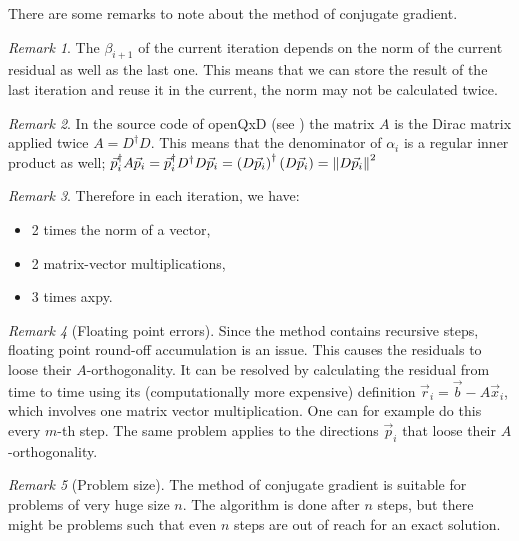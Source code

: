 \documentclass{article}
\theoremstyle{plain} %
\theoremstyle{convention} %
\theoremstyle{remark} %
\newtheorem*{remark}{Remark} %
\numberwithin{equation}{section}
\begin{document}
There are some remarks to note about the method of conjugate gradient.

\begin{remark}
    The $\beta_{i+1}$ of the current iteration depends on the norm of the current residual as well as the last one. This means that we can store the result of the last iteration and reuse it in the current, the norm may not be calculated twice.
\end{remark}

\begin{remark}
    In the source code of openQxD (see \cite{openqxd}) the matrix $A$ is the Dirac matrix applied twice $A = D^{\dagger} D$. This means that the denominator of $\alpha_i$ is a regular inner product as well; $\vec{p}_i^{\dagger} A \vec{p}_i = \vec{p}_i^{\dagger} D^{\dagger} D \vec{p}_i = \left( D \vec{p}_i \right)^{\dagger} \left( D \vec{p}_i \right) = \norm{ D \vec{p}_i }^2$
\end{remark}

\begin{remark}
    Therefore in each iteration, we have:
    \begin{itemize}
        \item 2 times the norm of a vector,
        \item 2 matrix-vector multiplications,
        \item 3 times axpy.\footnotemark
    \end{itemize}
\end{remark}

\begin{remark}[Floating point errors]
    Since the method contains recursive steps, floating point round-off accumulation is an issue. This causes the residuals to loose their $A$-orthogonality. It can be resolved by calculating the residual from time to time using its (computationally more expensive) definition $\vec{r}_i = \vec{b} - A \vec{x}_i$, which involves one matrix vector multiplication. One can for example do this every $m$-th step. The same problem applies to the directions $\vec{p}_i$ that loose their $A$-orthogonality.
\end{remark}

\begin{remark}[Problem size]
    The method of conjugate gradient is suitable for problems of very huge size $n$. The algorithm is done after $n$ steps, but there might be problems such that even $n$ steps are out of reach for an exact solution.
\end{remark}
\end{document}
